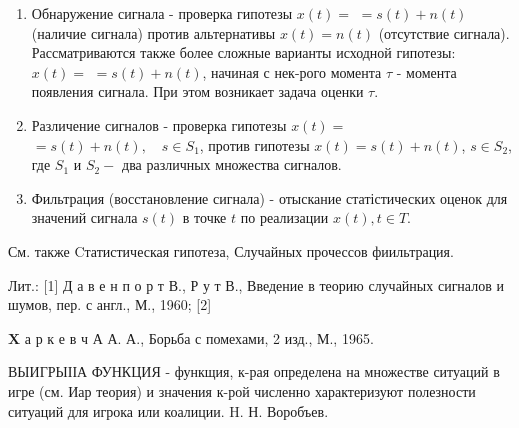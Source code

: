 \documentclass[10pt]{article}
\begin{document}
\begin{enumerate}

  \item Обнаружение сигнала - проверка гипотезы $x(t)=$ $=s(t)+n(t)$ (наличие сигнала) против альтернативы $x(t)=n(t)$ (отсутствие сигнала). Рассматриваются также более сложные варианты исходной гипотезы: $x(t)=$ $=s(t)+n(t)$, начиная с нек-рого момента $\tau$ - момента появления сигнала. При этом возникает задача оценки $\tau$.



  \item Различение сигналов - проверка гипотезы $x(t)=$ $=s(t)+n(t), \quad s \in S_{1}$, против гипотезы $x(t)=s(t)+n(t)$, $s \in S_{2}$, где $S_{1}$ и $S_{2}-$ два различных множества сигналов.



  \item Фильтрация (восстановление сигнала) - отыскание статістических оценок для значений сигнала $s(t)$ в точке $t$ по реализации $x(t), t \in T$.



\end{enumerate}



См. также Cтатистическая гипотеза, Случайных прочессов фиильтрация.



Лит.: [1] Д а в е н п о р т В., Р у т В., Введение в теорию случайных сигналов и шумов, пер. с англ., М., 1960; [2]

$\mathbf{X}$ а р к е в ч А А. А., Борьба с помехами, 2 изд., М., 1965.



ВЫИГРЫІІА ФУНКЦИЯ - функщия, к-рая определена на множестве ситуаций в игре (см. Иар теория) и значения к-рой численно характеризуют полезности ситуаций для игрока или коалиции. H. Н. Воробъев.
\end{document}
